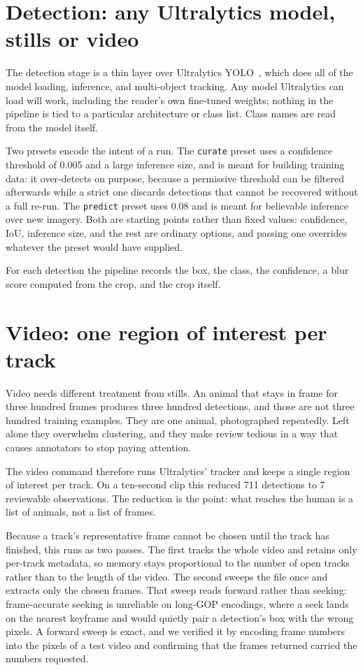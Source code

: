 \documentclass[10pt,letterpaper]{article}
\newcommand{\code}[1]{\texttt{\small #1}}
\begin{document}
\section{Detection: any Ultralytics model, stills or video}

The detection stage is a thin layer over
Ultralytics YOLO~\cite{ultralytics}, which does all of the model loading,
inference, and multi-object tracking. Any model Ultralytics can load will work,
including the reader's own fine-tuned weights; nothing in the pipeline is tied to
a particular architecture or class list. Class names are read from the model
itself.

Two presets encode the intent of a run. The \code{curate} preset uses a
confidence threshold of 0.005 and a large inference size, and is meant for
building training data: it over-detects on purpose, because a permissive
threshold can be filtered afterwards while a strict one discards detections that
cannot be recovered without a full re-run. The \code{predict} preset uses 0.08
and is meant for believable inference over new imagery. Both are starting
points rather than fixed values: confidence, IoU, inference size, and the rest
are ordinary options, and passing one overrides whatever the preset would have
supplied.

For each detection the pipeline records the box, the class, the confidence, a
blur score computed from the crop, and the crop itself.

\section{Video: one region of interest per track}

Video needs different treatment from stills. An animal that stays in frame for
three hundred frames produces three hundred detections, and those are not three
hundred training examples. They are one animal, photographed repeatedly. Left
alone they overwhelm clustering, and they make review tedious in a way that
causes annotators to stop paying attention.

The video command therefore runs Ultralytics' tracker and keeps a single region
of interest per track. On a ten-second clip this reduced 711 detections to 7
reviewable observations. The reduction is the point: what reaches the human is a
list of animals, not a list of frames.

Because a track's representative frame cannot be chosen until the track has
finished, this runs as two passes. The first tracks the whole video and retains
only per-track metadata, so memory stays proportional to the number of open
tracks rather than to the length of the video. The second sweeps the file once
and extracts only the chosen frames. That sweep reads forward rather than
seeking: frame-accurate seeking is unreliable on long-GOP encodings, where a
seek lands on the nearest keyframe and would quietly pair a detection's box with
the wrong pixels. A forward sweep is exact, and we verified it by encoding frame
numbers into the pixels of a test video and confirming that the frames returned
carried the numbers requested.
\end{document}
